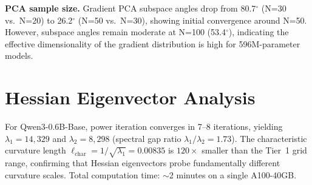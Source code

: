 \documentclass{article}
\begin{document}
\textbf{PCA sample size.} Gradient PCA subspace angles drop from 80.7$^{\circ}$ (N=30 vs.\ N=20) to 26.2$^{\circ}$ (N=50 vs.\ N=30), showing initial convergence around N=50. However, subspace angles remain moderate at N=100 (53.4$^{\circ}$), indicating the effective dimensionality of the gradient distribution is high for 596M-parameter models.

\section{Hessian Eigenvector Analysis}
\label{app:hessian}

For Qwen3-0.6B-Base, power iteration converges in 7--8 iterations, yielding $\lambda_1 = 14{,}329$ and $\lambda_2 = 8{,}298$ (spectral gap ratio $\lambda_1/\lambda_2 = 1.73$). The characteristic curvature length $\ell_{\mathrm{char}} = 1/\sqrt{\lambda_1} = 0.00835$ is $120\times$ smaller than the Tier~1 grid range, confirming that Hessian eigenvectors probe fundamentally different curvature scales. Total computation time: $\sim$2 minutes on a single A100-40GB.
\end{document}
